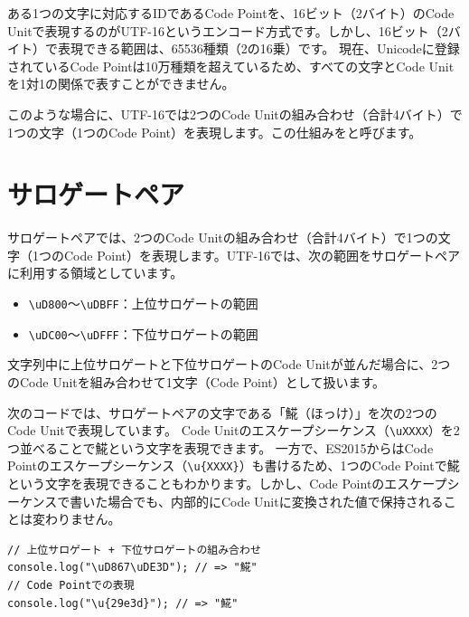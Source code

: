 ある1つの文字に対応するIDであるCode Pointを、16ビット（2バイト）のCode
Unitで表現するのがUTF-16というエンコード方式です。しかし、16ビット（2バイト）で表現できる範囲は、65536種類（2の16乗）です。
現在、Unicodeに登録されているCode
Pointは10万種類を超えているため、すべての文字とCode
Unitを1対1の関係で表すことができません。

このような場合に、UTF-16では2つのCode
Unitの組み合わせ（合計4バイト）で1つの文字（1つのCode
Point）を表現します。この仕組みを\textbf{}と呼びます。

\hypertarget{surrogate-pair}{%
\section{サロゲートペア}\label{surrogate-pair}}

サロゲートペアでは、2つのCode
Unitの組み合わせ（合計4バイト）で1つの文字（1つのCode
Point）を表現します。UTF-16では、次の範囲をサロゲートペアに利用する領域としています。

\begin{itemize}
\item
  \texttt{\textbackslash uD800}～\texttt{\textbackslash uDBFF}：上位サロゲートの範囲
\item
  \texttt{\textbackslash uDC00}～\texttt{\textbackslash uDFFF}：下位サロゲートの範囲
\end{itemize}

文字列中に上位サロゲートと下位サロゲートのCode
Unitが並んだ場合に、2つのCode Unitを組み合わせて1文字（Code
Point）として扱います。

次のコードでは、サロゲートペアの文字である「𩸽（ほっけ）」を次の2つのCode
Unitで表現しています。 Code
Unitのエスケープシーケンス（\texttt{\textbackslash uXXXX}）を2つ並べることで𩸽という文字を表現できます。
一方で、ES2015からはCode
Pointのエスケープシーケンス（\texttt{\textbackslash u\{XXXX\}}）も書けるため、1つのCode
Pointで𩸽という文字を表現できることもわかります。しかし、Code
Pointのエスケープシーケンスで書いた場合でも、内部的にCode
Unitに変換された値で保持されることは変わりません。

\begin{lstlisting}
// 上位サロゲート + 下位サロゲートの組み合わせ
console.log("\uD867\uDE3D"); // => "𩸽"
// Code Pointでの表現
console.log("\u{29e3d}"); // => "𩸽"
\end{lstlisting}

